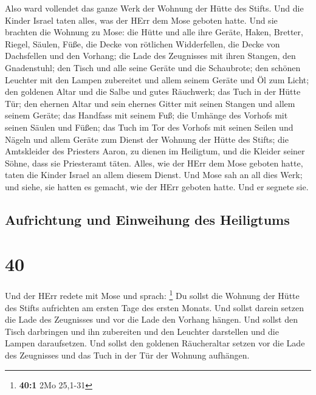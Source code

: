  Also ward vollendet das ganze Werk der Wohnung der Hütte
des Stifts. Und die Kinder Israel taten alles, was der HErr dem Mose
geboten hatte.  Und sie brachten die Wohnung zu Mose: die
Hütte und alle ihre Geräte, Haken, Bretter, Riegel, Säulen, Füße,
 die Decke von rötlichen Widderfellen, die Decke von
Dachsfellen und den Vorhang;  die Lade des Zeugnisses mit
ihren Stangen, den Gnadenstuhl;  den Tisch und alle seine
Geräte und die Schaubrote;  den schönen Leuchter mit den
Lampen zubereitet und allem seinem Geräte und Öl zum Licht;
 den goldenen Altar und die Salbe und gutes Räuchwerk;
das Tuch in der Hütte Tür;  den ehernen Altar und sein
ehernes Gitter mit seinen Stangen und allem seinem Geräte; das Handfass
mit seinem Fuß;  die Umhänge des Vorhofs mit seinen
Säulen und Füßen; das Tuch im Tor des Vorhofs mit seinen Seilen und
Nägeln und allem Geräte zum Dienst der Wohnung der Hütte des Stifts;
 die Amtskleider des Priesters Aaron, zu dienen im
Heiligtum, und die Kleider seiner Söhne, dass sie Priesteramt täten.
 Alles, wie der HErr dem Mose geboten hatte, taten die
Kinder Israel an allem diesem Dienst.  Und Mose sah an
all dies Werk; und siehe, sie hatten es gemacht, wie der HErr geboten
hatte. Und er segnete sie.

\hypertarget{aufrichtung-und-einweihung-des-heiligtums}{%
\subsection{Aufrichtung und Einweihung des
Heiligtums}\label{aufrichtung-und-einweihung-des-heiligtums}}

\hypertarget{section-39}{%
\section{40}\label{section-39}}

 Und der HErr redete mit Mose und sprach: \footnote{\textbf{40:1}
  2Mo 25,1-31}  Du sollst die Wohnung der Hütte des Stifts
aufrichten am ersten Tage des ersten Monats.  Und sollst
darein setzen die Lade des Zeugnisses und vor die Lade den Vorhang
hängen.  Und sollst den Tisch darbringen und ihn
zubereiten und den Leuchter darstellen und die Lampen daraufsetzen.
 Und sollst den goldenen Räucheraltar setzen vor die Lade
des Zeugnisses und das Tuch in der Tür der Wohnung aufhängen.

